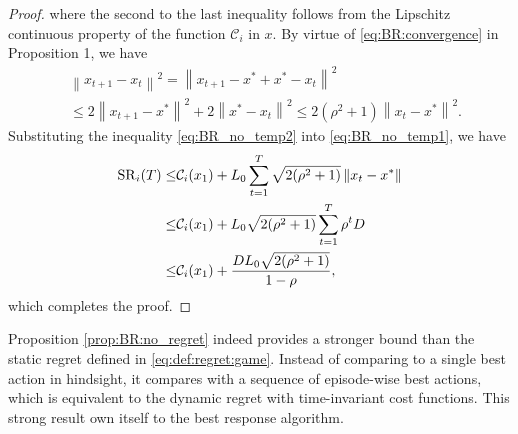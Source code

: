 \begin{proof}
where the second to the last inequality follows from the Lipschitz continuous property of the function $\mathcal{C}_i$ in $x$.
By virtue of \eqref{eq:BR:convergence} in Proposition 1, we have
\begin{align}\label{eq:BR_no_temp2}
    &\left\|x_{t+1} - x_{t}\right\|^2 = \left\|x_{t+1} -x^{*}+x^{*} -x_{t}\right\|^2 \nonumber \\
    &\leq  2 \left\|x_{t+1} -x^{*}\right\|^2 + 2 \left\|x^{*} -x_{t}\right\|^2 
    \leq  2(\rho^2+1)\left\|x_{t}-x^{*} \right\|^2.
\end{align}
Substituting the inequality \eqref{eq:BR_no_temp2} into \eqref{eq:BR_no_temp1}, we have 
\begin{align}\label{eq:BR_no_temp3}
    {\rm{SR}}_i(T) 
    \leq & \mathcal{C}_i(x_1) + L_0 \sum_{t=1}^T \sqrt{2(\rho^2+1)} \left\|x_{t} - x^{*}\right\|  \nonumber \\
    \leq &  \mathcal{C}_i(x_1) + L_0 \sqrt{2(\rho^2+1)} \sum_{t=1}^T \rho^t D \nonumber \\
    \leq & \mathcal{C}_i(x_1)+\frac{ DL_0 \sqrt{2(\rho^2+1)}} {1-\rho},
\end{align}
which completes the proof.
\end{proof}

Proposition \ref{prop:BR:no_regret} indeed provides a stronger bound than the static regret defined in \eqref{eq:def:regret:game}. Instead of comparing to a single best action in hindsight, it compares with a sequence of episode-wise best actions, which is equivalent to the dynamic regret with time-invariant cost functions. This strong result own itself to the best response algorithm.
